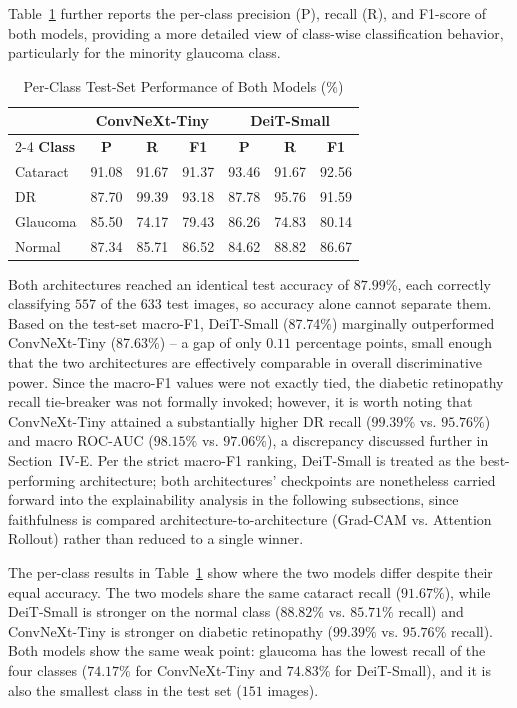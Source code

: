 Table~\ref{tab:per_class_performance} further reports the per-class precision (P), recall (R), and F1-score of both models, providing a more detailed view of class-wise classification behavior, particularly for the minority glaucoma class.

\begin{table}[htbp]
\caption{Per-Class Test-Set Performance of Both Models (\%)}
\label{tab:per_class_performance}
\centering
\begin{tabular*}{\columnwidth}{@{\extracolsep{\fill}}lcccccc@{}}
\toprule
 & \multicolumn{3}{c}{\textbf{ConvNeXt-Tiny}} & \multicolumn{3}{c}{\textbf{DeiT-Small}} \\
\cmidrule{2-4} \cmidrule{5-7}
\textbf{Class} & \textbf{P} & \textbf{R} & \textbf{F1} & \textbf{P} & \textbf{R} & \textbf{F1} \\
\midrule
Cataract & 91.08 & 91.67 & 91.37 & 93.46 & 91.67 & 92.56 \\
DR & 87.70 & 99.39 & 93.18 & 87.78 & 95.76 & 91.59 \\
Glaucoma & 85.50 & 74.17 & 79.43 & 86.26 & 74.83 & 80.14 \\
Normal & 87.34 & 85.71 & 86.52 & 84.62 & 88.82 & 86.67 \\
\bottomrule
\end{tabular*}
\end{table}

Both architectures reached an identical test accuracy of $87.99\%$, each correctly classifying $557$ of the $633$ test images, so accuracy alone cannot separate them.
Based on the test-set macro-F1, DeiT-Small (87.74\%) marginally outperformed ConvNeXt-Tiny (87.63\%) -- a gap of only $0.11$ percentage points, small enough that the two architectures are effectively comparable in overall discriminative power.
Since the macro-F1 values were not exactly tied, the diabetic retinopathy recall tie-breaker was not formally invoked; however, it is worth noting that ConvNeXt-Tiny attained a substantially higher DR recall ($99.39\%$ vs. $95.76\%$) and macro ROC-AUC ($98.15\%$ vs. $97.06\%$), a discrepancy discussed further in Section~IV-E.
Per the strict macro-F1 ranking, DeiT-Small is treated as the best-performing architecture; both architectures' checkpoints are nonetheless carried forward into the explainability analysis in the following subsections, since faithfulness is compared architecture-to-architecture (Grad-CAM vs. Attention Rollout) rather than reduced to a single winner.

The per-class results in Table~\ref{tab:per_class_performance} show where the two models differ despite their equal accuracy.
The two models share the same cataract recall ($91.67\%$), while DeiT-Small is stronger on the normal class ($88.82\%$ vs. $85.71\%$ recall) and ConvNeXt-Tiny is stronger on diabetic retinopathy ($99.39\%$ vs. $95.76\%$ recall).
Both models show the same weak point: glaucoma has the lowest recall of the four classes ($74.17\%$ for ConvNeXt-Tiny and $74.83\%$ for DeiT-Small), and it is also the smallest class in the test set ($151$ images).

